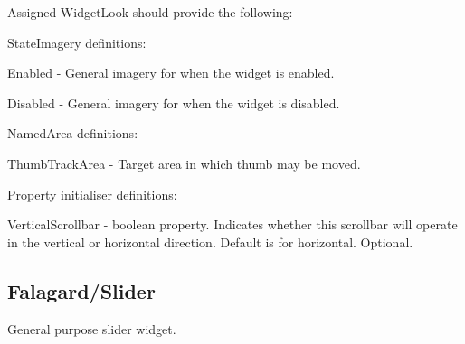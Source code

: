Assigned Widget\+Look should provide the following\+: 
\begin{DoxyItemize}
\item State\+Imagery definitions\+: 
\begin{DoxyItemize}
\item Enabled -\/ General imagery for when the widget is enabled. 
\item Disabled -\/ General imagery for when the widget is disabled. 
\end{DoxyItemize}


\item Named\+Area definitions\+: 
\begin{DoxyItemize}
\item Thumb\+Track\+Area -\/ Target area in which thumb may be moved. 
\end{DoxyItemize}


\item Property initialiser definitions\+: 
\begin{DoxyItemize}
\item Vertical\+Scrollbar -\/ boolean property. Indicates whether this scrollbar will operate in the vertical or horizontal direction. Default is for horizontal. Optional. 
\end{DoxyItemize}
\end{DoxyItemize}\hypertarget{fal_wr_ref_fal_wr_ref_sec_19}{}\subsection{Falagard/\+Slider}\label{fal_wr_ref_fal_wr_ref_sec_19}
General purpose slider widget.

